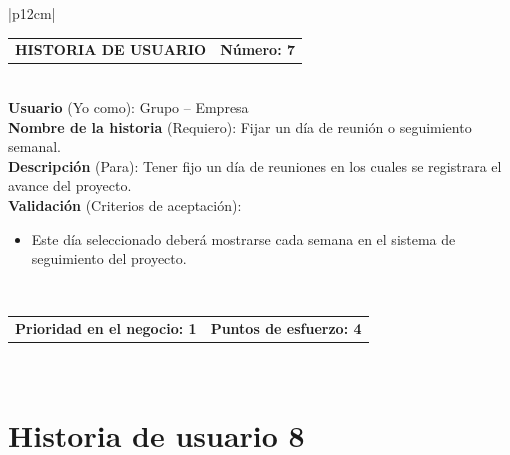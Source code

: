 \documentclass[11pt,letterpaper]{report}
\begin{document}
	\begin{center}	
		\begin{tabular}{|p{12cm}|}
			\hline
			\begin{tabular}{c|c}
				\textbf{HISTORIA DE USUARIO} & \textbf{Número: 7} \\
			\end{tabular} \\ \hline
			\textbf{Usuario} (Yo como): Grupo – Empresa \\ \hline
			\textbf{Nombre de la historia} (Requiero): Fijar un día de reunión o seguimiento semanal. \\ \hline
			\textbf{Descripción} (Para): Tener fijo un día de reuniones en los cuales se registrara el avance del proyecto. \\ \hline
			\textbf{Validación} (Criterios de aceptación): \\
			\begin{minipage}{12cm}
				\begin{itemize}
					\item Este día seleccionado deberá mostrarse cada semana en el sistema de seguimiento del proyecto.
				\end{itemize}
			\end{minipage} \\ \hline
			\begin{tabular}{c|c}
				\textbf{Prioridad en el negocio: 1} & \textbf{Puntos de esfuerzo: 4} \\
			\end{tabular} \\ \hline
		\end{tabular}
	\end{center}
	
	\section{Historia de usuario 8}
	
\end{document}
